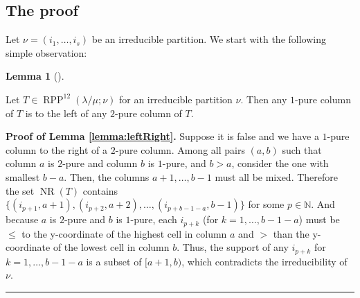 \documentclass[numbers=enddot,12pt,final,onecolumn,notitlepage]{scrartcl}%
\theoremstyle{definition}
\newtheorem{lem}[theo]{Lemma}
\newenvironment{lemma}[1][]
{\begin{lem}[#1]\begin{leftbar}}
{\end{leftbar}\end{lem}}
\newenvironment{proof}[1][Proof]{\noindent\textbf{#1.} }{\ \rule{0.5em}{0.5em}}
\newcommand{\NN}{\mathbb{N}}
\def\seplistvar{{{\nu}}} %
\def\NS{{\operatorname{NR}}}
\def\OneTwoRPPCutvar{{\operatorname{RPP}^{12}\left(  \lambda/\mu ;\seplistvar \right)}}
\begin{document}
\subsection{The proof}
Let $\seplistvar=(i_1,\dots,i_s)$ be an irreducible partition. We start with the following simple observation:
\begin{lemma}
\label{lemma:leftRight}
 Let $T\in\OneTwoRPPCutvar$ for an irreducible partition $\seplistvar$. Then any $1$-pure column of $T$ is to the left of any $2$-pure column of $T$.
\end{lemma}
\begin{proof}[Proof of Lemma \ref{lemma:leftRight}]
Suppose it is false and we have a $1$-pure column to the right of a $2$-pure column. Among all pairs $\left(a, b\right)$ such that column $a$ is $2$-pure and column $b$ is $1$-pure, and $b > a$, consider the one with smallest $b-a$. Then, the columns $a+1,\dots,b-1$ must all be mixed. %
Therefore the set $\NS(T)$ contains $\{(i_{p+1},a+1),(i_{p+2},a+2),\dots,(i_{p+b-1-a},b-1)\}$ for some $p\in\NN$. And because $a$ is $2$-pure and $b$ is $1$-pure, each $i_{p+k}$ (for $k=1,\dots, b-1-a$) must be $\leq$ to the y-coordinate of the highest cell in column $a$ and $>$ than the y-coordinate of the lowest cell in column $b$. Thus, the support of any $i_{p+k}$ for $k=1,\dots, b-1-a$ is a subset of $[a+1,b)$, which contradicts the irreducibility of $\seplistvar$.
\end{proof}
\end{document}
